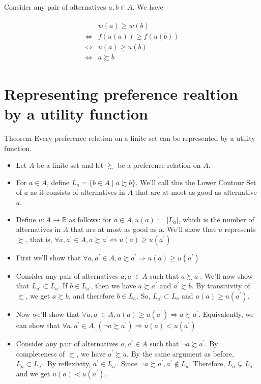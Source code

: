 \documentclass[12pt,a4paper,fleqn]{article}
\begin{document}
Consider any pair of alternatives \(a, b \in A\). We have

\begin{align*}
\begin{aligned}
& w(a) \geq w(b) \\
\Leftrightarrow & f(u(a)) \geq f(u(b)) \\
\Leftrightarrow & u(a) \geq u(b) \\
\Leftrightarrow & a \succsim b
\end{aligned}
\end{align*}

 \section{Representing preference realtion by a utility function} 

 Theorem
Every preference relation on a finite set can be represented by a utility function.
\begin{itemize}
  \item  Let \(A\) be a finite set and let \(\succsim \) be a preference relation on \(A\).
  \item For \(a \in A\), define \(L_a=\{b \in A \mid a \succsim b\} \). We'll call this the Lower Contour Set of \(a\) as it consists of alternatives in \(A\) that are at most as good as alternative \(a\).
  \item Define \(u: A \rightarrow \mathbb{R}\) as follows: for \(a \in A, u(a):=\left|L_a\right|\), which is the number of alternatives in \(A\) that are at most as good as a. We'll show that \(u\) represents \(\succsim \), that is, \(\forall a, a^{\prime} \in A, a \succsim a^{\prime} \Leftrightarrow u(a) \geq u\left(a^{\prime}\right)\)
  \item  First we'll show that \(\forall a, a^{\prime} \in A, a \succsim a^{\prime} \Rightarrow u(a) \geq u\left(a^{\prime}\right)\)
  \item Consider any pair of alternatives \(a, a^{\prime} \in A\) such that \(a \succsim a^{\prime}\). We'll now show that \(L_{a^{\prime}} \subset L_a\). If \(b \in L_{a^{\prime}}\), then we have \(a \succsim a^{\prime}\) and \(a^{\prime} \succsim b\). By transitivity of \(\succsim \), we get \(a \succsim b\), and therefore \(b \in L_a\). So, \(L_{a^{\prime}} \subset L_a\) and \(u(a) \geq u\left(a^{\prime}\right)\).
  \item Now we'll show that \(\forall a, a^{\prime} \in A, u(a) \geq u\left(a^{\prime}\right) \Rightarrow a \succsim a^{\prime}\). Equivalently, we can show that \(\forall a, a^{\prime} \in A,\left(\neg a \succsim a^{\prime}\right) \Rightarrow u(a)<u\left(a^{\prime}\right)\)
  \item Consider any pair of alternatives \(a, a^{\prime} \in A\) such that \(\neg a \succsim a^{\prime}\). By completeness of \(\succsim \), we have \(a^{\prime} \succsim a\). By the same argument as before, \(L_a \subset L_{a^{\prime}}\). By reflexivity, \(a^{\prime} \in L_{a^{\prime}}\). Since \(\neg a \succsim a^{\prime}, a^{\prime} \notin L_a\). Therefore, \(L_a \subsetneq L_{a^{\prime}}\) and we get \(u(a)<u\left(a^{\prime}\right)\).
\end{itemize}
\end{document}
